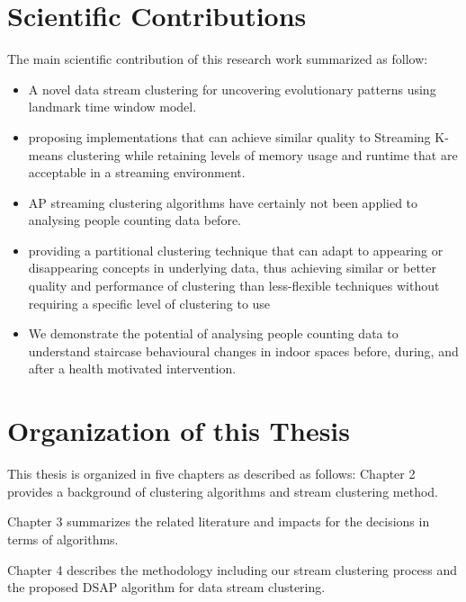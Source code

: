 

\section{Scientific Contributions}


The main scientific contribution of this research work summarized as follow:

\begin{itemize}
    \item A novel data stream clustering for uncovering evolutionary patterns using landmark time window model. 
    \item proposing implementations that can achieve similar quality to  Streaming K-means clustering while retaining levels of memory usage and runtime that are acceptable in a streaming environment.
    \item AP streaming clustering algorithms have certainly not been applied to analysing people counting data before.
    \item  providing a partitional clustering technique that can adapt to appearing or disappearing concepts in underlying data, thus achieving similar or better quality and performance of clustering than less-flexible techniques without requiring a specific level of clustering to use
    \item We demonstrate the potential of analysing people counting data to understand staircase behavioural changes in indoor spaces before, during, and after a health motivated intervention.
\end{itemize}




\section{Organization of this Thesis}
This thesis is organized in five chapters as described as follows:
Chapter 2 provides a background of clustering algorithms and stream clustering method. 

Chapter 3 summarizes the related literature and impacts for the decisions in terms of algorithms.

Chapter 4 describes the methodology including our stream clustering process and the proposed DSAP algorithm for data stream clustering.

